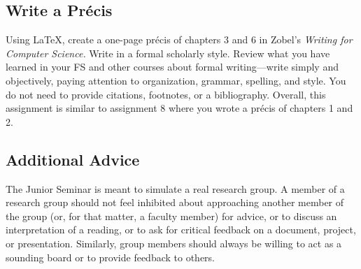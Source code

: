 
\usepackage[compact]{titlesec}





\subsection*{Write a Pr\'{e}cis}

Using \LaTeX, create a one-page pr\'{e}cis of chapters 3 and 6 in Zobel's {\em Writing for Computer Science.} Write in a
formal scholarly style. Review what you have learned in your FS and other courses about formal writing---write simply
and objectively, paying attention to organization, grammar, spelling, and style. You do not need to provide citations,
footnotes, or a bibliography. Overall, this assignment is similar to assignment 8 where you wrote a pr\'{e}cis of
chapters 1 and 2.


\subsection*{Additional Advice}

The Junior Seminar is meant to simulate a real research group.  A member of a research group should not feel inhibited
about approaching another member of the group (or, for that matter, a faculty member) for advice, or to discuss an
interpretation of a reading, or to ask for critical feedback on a document, project, or presentation.  Similarly, group
members should always be willing to act as a sounding board or to provide feedback to others.



